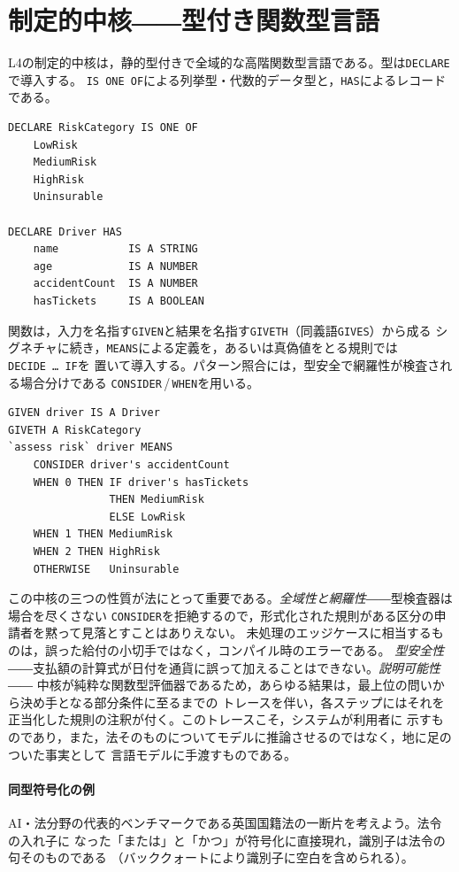 \documentclass[11pt,a4paper]{ltjsarticle}
\newcommand{\code}[1]{\texttt{\small #1}}
\begin{document}
\section{制定的中核――型付き関数型言語}\label{sec:constitutive}
L4の制定的中核は，静的型付きで全域的な高階関数型言語である。型は\code{DECLARE}で導入する。
\code{IS ONE OF}による列挙型・代数的データ型と，\code{HAS}によるレコードである。

\begin{lstlisting}
DECLARE RiskCategory IS ONE OF
    LowRisk
    MediumRisk
    HighRisk
    Uninsurable

DECLARE Driver HAS
    name           IS A STRING
    age            IS A NUMBER
    accidentCount  IS A NUMBER
    hasTickets     IS A BOOLEAN
\end{lstlisting}

関数は，入力を名指す\code{GIVEN}と結果を名指す\code{GIVETH}（同義語\code{GIVES}）から成る
シグネチャに続き，\code{MEANS}による定義を，あるいは真偽値をとる規則では\code{DECIDE\,\ldots\,IF}を
置いて導入する。パターン照合には，型安全で網羅性が検査される場合分けである
\code{CONSIDER}\,/\,\code{WHEN}を用いる。

\begin{lstlisting}
GIVEN driver IS A Driver
GIVETH A RiskCategory
`assess risk` driver MEANS
    CONSIDER driver's accidentCount
    WHEN 0 THEN IF driver's hasTickets
                THEN MediumRisk
                ELSE LowRisk
    WHEN 1 THEN MediumRisk
    WHEN 2 THEN HighRisk
    OTHERWISE   Uninsurable
\end{lstlisting}

この中核の三つの性質が法にとって重要である。\emph{全域性と網羅性}――型検査器は場合を尽くさない
\code{CONSIDER}を拒絶するので，形式化された規則がある区分の申請者を黙って見落とすことはありえない。
未処理のエッジケースに相当するものは，誤った給付の小切手ではなく，コンパイル時のエラーである。
\emph{型安全性}――支払額の計算式が日付を通貨に誤って加えることはできない。\emph{説明可能性}――
中核が純粋な関数型評価器であるため，あらゆる結果は，最上位の問いから決め手となる部分条件に至るまでの
トレースを伴い，各ステップにはそれを正当化した規則の注釈が付く。このトレースこそ，システムが利用者に
示すものであり，また，法そのものについてモデルに推論させるのではなく，地に足のついた事実として
言語モデルに手渡すものである。

\paragraph{同型符号化の例}
AI・法分野の代表的ベンチマークである英国国籍法の一断片を考えよう\cite{sergot1986bna}。法令の入れ子に
なった「または」と「かつ」が符号化に直接現れ，識別子は法令の句そのものである
（バッククォートにより識別子に空白を含められる）。
\end{document}
